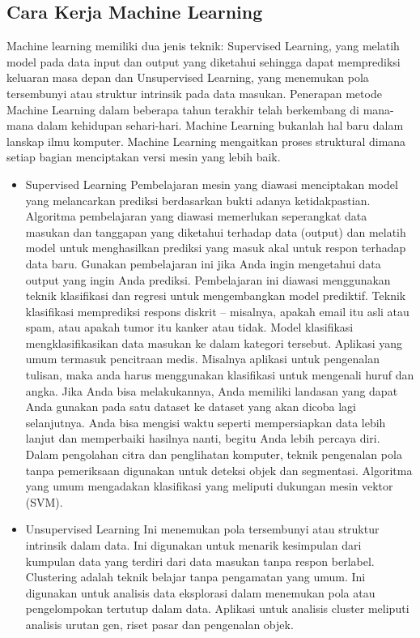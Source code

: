\subsection{Cara Kerja Machine Learning}
Machine learning memiliki dua jenis teknik: Supervised Learning, yang melatih model pada data input dan output yang diketahui sehingga dapat memprediksi keluaran masa depan dan Unsupervised Learning, yang menemukan pola tersembunyi atau struktur intrinsik pada data masukan.
Penerapan metode Machine Learning dalam beberapa tahun terakhir telah berkembang di mana-mana dalam kehidupan sehari-hari. Machine Learning bukanlah hal baru dalam lanskap ilmu komputer. Machine Learning mengaitkan proses struktural dimana setiap bagian menciptakan versi mesin yang lebih baik.
\begin{itemize}
\item Supervised Learning
Pembelajaran mesin yang diawasi menciptakan model yang melancarkan prediksi berdasarkan bukti adanya ketidakpastian. Algoritma pembelajaran yang diawasi memerlukan seperangkat data masukan dan tanggapan yang diketahui terhadap data (output) dan melatih model untuk menghasilkan prediksi yang masuk akal untuk respon terhadap data baru. Gunakan pembelajaran ini jika Anda ingin mengetahui data output yang ingin Anda prediksi. Pembelajaran ini diawasi menggunakan teknik klasifikasi dan regresi untuk mengembangkan model prediktif.
Teknik klasifikasi memprediksi respons diskrit – misalnya, apakah email itu asli atau spam, atau apakah tumor itu kanker atau tidak. Model klasifikasi mengklasifikasikan data masukan ke dalam kategori tersebut. Aplikasi yang umum termasuk pencitraan medis. Misalnya aplikasi untuk pengenalan tulisan, maka anda harus menggunakan klasifikasi untuk mengenali huruf dan angka.
Jika Anda bisa melakukannya, Anda memiliki landasan yang dapat Anda gunakan pada satu dataset ke dataset yang akan dicoba lagi selanjutnya. Anda bisa mengisi waktu seperti mempersiapkan data lebih lanjut dan memperbaiki hasilnya nanti, begitu Anda lebih percaya diri. Dalam pengolahan citra dan penglihatan komputer, teknik pengenalan pola tanpa pemeriksaan digunakan untuk deteksi objek dan segmentasi. Algoritma yang umum mengadakan klasifikasi yang meliputi dukungan mesin vektor (SVM).
\item Unsupervised Learning
Ini menemukan pola tersembunyi atau struktur intrinsik dalam data. Ini digunakan untuk menarik kesimpulan dari kumpulan data yang terdiri dari data masukan tanpa respon berlabel. Clustering adalah teknik belajar tanpa pengamatan yang umum. Ini digunakan untuk analisis data eksplorasi dalam menemukan pola atau pengelompokan tertutup dalam data. Aplikasi untuk analisis cluster meliputi analisis urutan gen, riset pasar dan pengenalan objek.

\end{itemize}
